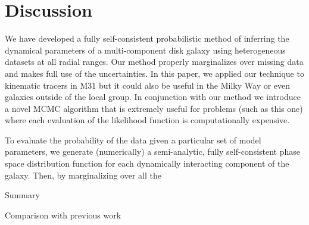 \documentclass[preprint]{aastex}
\begin{document}
\section{Discussion}

We have developed a fully self-consistent probabilistic method of inferring
the dynamical parameters of a multi-component disk galaxy using heterogeneous
datasets at all radial ranges. Our method properly marginalizes over missing
data and makes full use of the uncertainties. In this paper, we applied our
technique to kinematic tracers in M31 but it could also be useful in the
Milky Way or even galaxies outside of the local group. In conjunction with
our method we introduce a novel MCMC algorithm that is extremely useful for
problems (such as this one) where each evaluation of the likelihood function
is computationally expensive.

To evaluate the probability of the data given a particular set of model
parameters, we generate (numerically) a semi-analytic, fully self-consistent
phase space distribution function for each dynamically interacting component
of the galaxy. Then, by marginalizing over all the

Summary

Comparison with previous work










\end{document}
